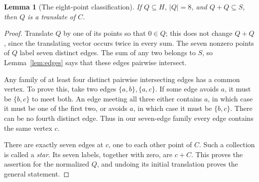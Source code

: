 \documentclass[11pt]{article}
\numberwithin{equation}{section}
\newtheorem{lemma}[theorem]{Lemma}
\theoremstyle{definition}
\theoremstyle{remark}\newtheorem{remark}[theorem]{Remark}
\begin{document}
\begin{lemma}[The eight-point classification]\label{lem:Q}
If $Q\subseteq H$, $|Q|=8$, and $Q+Q\subseteq S$, then $Q$ is a translate of $C$.
\end{lemma}
\begin{proof}
Translate $Q$ by one of its points so that $0\in Q$; this does not change $Q+Q$, since the translating vector occurs twice in every sum. The seven nonzero points of $Q$ label seven distinct edges. The sum of any two belongs to $S$, so Lemma~\ref{lem:edges} says that these edges pairwise intersect.

Any family of at least four distinct pairwise intersecting edges has a common vertex. To prove this, take two edges $\{a,b\},\{a,c\}$. If some edge avoids $a$, it must be $\{b,c\}$ to meet both. An edge meeting all three either contains $a$, in which case it must be one of the first two, or avoids $a$, in which case it must be $\{b,c\}$. There can be no fourth distinct edge. Thus in our seven-edge family every edge contains the same vertex $c$.

There are exactly seven edges at $c$, one to each other point of $C$. Such a collection is called a \emph{star}. Its seven labels, together with zero, are $c+C$. This proves the assertion for the normalized $Q$, and undoing its initial translation proves the general statement.
\end{proof}
\end{document}
